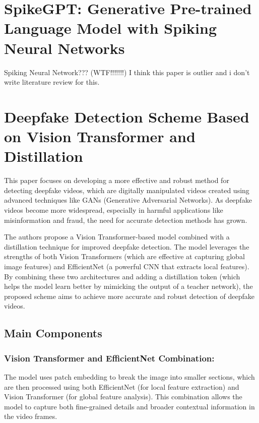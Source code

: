 \documentclass{report}
\begin{document}
	\chapter{SpikeGPT: Generative Pre-trained Language Model with Spiking Neural Networks \cite{zhu2024spikegptgenerativepretrainedlanguage}}
	

	
	Spiking Neural Network??? (WTF!!!!!!!)
	I think this paper is outlier and i don't write literature review for this.
	
	
	
	
	
	
	
	
	
	
	
	
	\chapter{Deepfake Detection Scheme Based on Vision Transformer and Distillation \cite{DBLP:journals/corr/abs-2104-01353}}
	
	
	This paper focuses on developing a more effective and robust method for detecting deepfake videos, which are digitally manipulated videos created using advanced techniques like GANs (Generative Adversarial Networks). As deepfake videos become more widespread, especially in harmful applications like misinformation and fraud, the need for accurate detection methods has grown.
	
	
	The authors propose a Vision Transformer-based model combined with a distillation technique for improved deepfake detection. The model leverages the strengths of both Vision Transformers (which are effective at capturing global image features) and EfficientNet (a powerful CNN that extracts local features). By combining these two architectures and adding a distillation token (which helps the model learn better by mimicking the output of a teacher network), the proposed scheme aims to achieve more accurate and robust detection of deepfake videos.
	
	
	\section{Main Components}
	
	\subsection{Vision Transformer and EfficientNet Combination:}
	The model uses patch embedding to break the image into smaller sections, which are then processed using both EfficientNet (for local feature extraction) and Vision Transformer (for global feature analysis). This combination allows the model to capture both fine-grained details and broader contextual information in the video frames.
	
\end{document}
